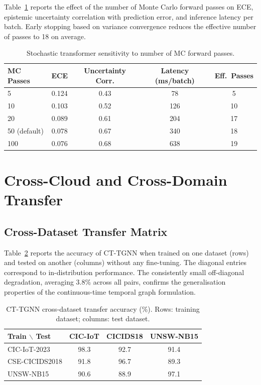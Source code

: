 Table~\ref{tab:app_sens_mc} reports the effect of the number of Monte Carlo forward passes on ECE, epistemic uncertainty correlation with prediction error, and inference latency per batch. Early stopping based on variance convergence reduces the effective number of passes to 18 on average.

\begin{table}[htbp]
\centering
\caption{Stochastic transformer sensitivity to number of MC forward passes.}
\label{tab:app_sens_mc}
\begin{tabular}{lcccc}
\toprule
MC Passes & ECE & Uncertainty Corr. & Latency (ms/batch) & Eff.\ Passes \\
\midrule
5   & 0.124 & 0.43 & 78  & 5 \\
10  & 0.103 & 0.52 & 126 & 10 \\
20  & 0.089 & 0.61 & 204 & 17 \\
50 (default) & 0.078 & 0.67 & 340 & 18 \\
100 & 0.076 & 0.68 & 638 & 19 \\
\bottomrule
\end{tabular}
\end{table}


\section{Cross-Cloud and Cross-Domain Transfer}
\label{app:cross_cloud}

\subsection{Cross-Dataset Transfer Matrix}
\label{app:transfer_matrix}

Table~\ref{tab:app_transfer} reports the accuracy of CT-TGNN when trained on one dataset (rows) and tested on another (columns) without any fine-tuning. The diagonal entries correspond to in-distribution performance. The consistently small off-diagonal degradation, averaging 3.8\% across all pairs, confirms the generalisation properties of the continuous-time temporal graph formulation.

\begin{table}[htbp]
\centering
\caption{CT-TGNN cross-dataset transfer accuracy (\%). Rows: training dataset; columns: test dataset.}
\label{tab:app_transfer}
\begin{tabular}{lccc}
\toprule
Train $\backslash$ Test & CIC-IoT & CICIDS18 & UNSW-NB15 \\
\midrule
CIC-IoT-2023   & 98.3 & 92.7 & 91.4 \\
CSE-CICIDS2018 & 91.8 & 96.7 & 89.3 \\
UNSW-NB15      & 90.6 & 88.9 & 97.1 \\
\bottomrule
\end{tabular}
\end{table}


